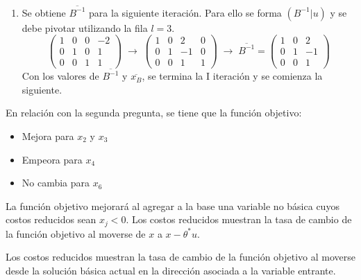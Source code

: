 \begin{enumerate}
\item Se obtiene $\overline{B^{-1}}$ para la siguiente iteración. Para ello se forma $(B^{-1}|u)$ y se debe pivotar utilizando la fila $l=3$.
    \[
\left(\begin{array}{ccc|c}
1 & 0 & 0 & -2 \\
0 & 1 & 0 & 1 \\
0 & 0 & 1 & 1
\end{array}\right)
\;\rightarrow \;
\left(\begin{array}{ccc|c}
1 & 0 & 2 & 0 \\
0 & 1 & -1 & 0 \\
0 & 0 & 1 & 1
\end{array}\right) \; \rightarrow \; \overline{B^{-1}} = \begin{pmatrix}
    1 & 0 & 2 \\ 0 & 1 & -1 \\ 0 & 0 & 1
\end{pmatrix}
\]
Con los valores de $\overline{B^{-1}}$ y $\overline{x_B}$, se termina la I iteración y se comienza la siguiente.
\end{enumerate}

En relación con la segunda pregunta, se tiene que la función objetivo:
\begin{itemize}
    \item Mejora para $x_2$ y $x_3$
    \item Empeora para $x_4$
    \item No cambia para $x_6$
\end{itemize}
La función objetivo mejorará al agregar a la base una variable no básica cuyos costos reducidos sean $x_j<0$. Los costos reducidos muestran la tasa de cambio de la función objetivo al moverse de $x$ a $x-\theta^*u$.

Los costos reducidos muestran la tasa de cambio de la función objetivo al moverse desde la solución básica actual en la dirección asociada a la variable entrante.
